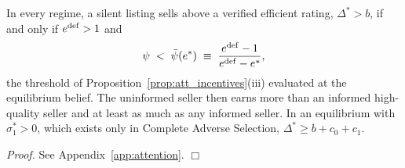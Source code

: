 \begin{proposition}
\begin{itemize}
\end{itemize}
In every regime, a silent listing sells above a verified efficient rating, $\Delta^*>b$, if and only if $e^{\rm def}>1$ and
\begin{equation}
    \psi\;<\;\bar\psi(e^*)\;\equiv\;\frac{e^{\rm def}-1}{e^{\rm def}-e^*},
    \label{eq:att_psibar}
\end{equation}
the threshold of Proposition~\ref{prop:att_incentives}(iii) evaluated at the equilibrium belief. The uninformed seller then earns more than an informed high-quality seller and at least as much as any informed seller. In an equilibrium with $\sigma_1^*>0$, which exists only in Complete Adverse Selection, $\Delta^*\ge b+c_0+c_1$.
\end{proposition}

\noindent\textit{Proof.} See Appendix~\ref{app:attention}. $\Box$

